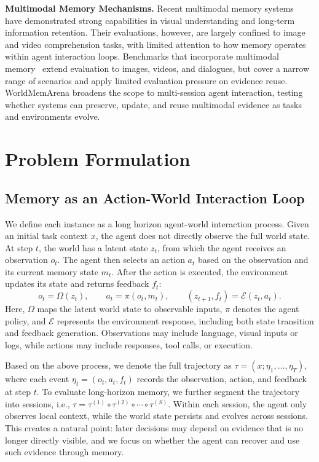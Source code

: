 \documentclass{article}
\begin{document}
\textbf{Multimodal Memory Mechanisms.} Recent multimodal memory systems~\cite{long2025seeinglisteningrememberingreasoning, liu2025memversemultimodalmemorylifelong, zhou2026videomemoryconsistentvideogeneration, fu2026latentmemcustomizinglatentmemory} have demonstrated strong capabilities in visual understanding and long-term information retention. Their evaluations, however, are largely confined to image and video comprehension tasks, with limited attention to how memory operates within agent interaction loops. Benchmarks that incorporate multimodal memory~\cite{bei2026memgallerybenchmarkingmultimodallongterm, lu2026mmamultimodalmemoryagent} extend evaluation to images, videos, and dialogues, but cover a narrow range of scenarios and apply limited evaluation pressure on evidence reuse. WorldMemArena broadens the scope to multi-session agent interaction, testing whether systems can preserve, update, and reuse multimodal evidence as tasks and environments evolve.


\section{Problem Formulation} 


\subsection{Memory as an Action-World Interaction Loop}
\label{sec:problem}
We define each instance as a long horizon agent-world interaction process. Given an initial task context $x$, the agent does not directly observe the full world state. At step $t$, the world has a latent state $z_t$, from which the agent receives an observation $o_t$. The agent then selects an action $a_t$ based on the observation and its current memory state $m_t$. After the action is executed, the environment updates its state and returns feedback $f_t$:
\vspace{-0.3em}
\[
o_t=\Omega(z_t), \qquad a_t=\pi(o_t,m_t), \qquad (z_{t+1},f_t)=\mathcal{E}(z_t,a_t).
\]
Here, $\Omega$ maps the latent world state to observable inputs, $\pi$ denotes the agent policy, and $\mathcal{E}$ represents the environment response, including both state transition and feedback generation. Observations may include  language, visual inputs or logs, while actions may include responses, tool calls, or execution.

Based on the above process, we denote the full trajectory as
$\tau=(x;\eta_1,\ldots,\eta_T)$, where each event
$\eta_t=(o_t,a_t,f_t)$ records the observation, action, and feedback at step
$t$. To evaluate long-horizon memory, we further segment the trajectory into
sessions, i.e.,
$\tau=\tau^{(1)}\circ\tau^{(2)}\circ\cdots\circ\tau^{(S)}$.
Within each session, the agent only observes local context, while the world state persists and evolves across sessions. This creates a natural point: later decisions may depend on evidence that is no longer directly visible, and we focus on whether the agent can recover and use such evidence through memory.
\end{document}
